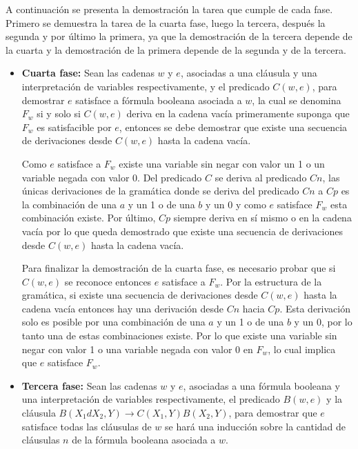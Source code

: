 A continuación se presenta la demostración la tarea que cumple de cada fase. Primero se demuestra la tarea de la cuarta fase, luego la tercera, después la segunda y por último la primera, ya que la demostración de la tercera depende de la cuarta y la demostración de la primera depende de la segunda y de la tercera.

\begin{itemize}
    \item \textbf{Cuarta fase:} Sean las cadenas $w$ y $e$, asociadas a una cláusula y una interpretación de variables respectivamente, y el predicado $C(w,e)$, para demostrar $e$
          satisface a fórmula booleana asociada a $w$, la cual se denomina $F_w$ si y solo si $C(w,e)$ deriva
          en la cadena vacía primeramente suponga que $F_w$ es satisfacible por $e$, entonces se debe demostrar que
          existe una secuencia de derivaciones desde $C(w,e)$ hasta la cadena vacía.
          
          Como $e$ satisface a $F_w$ existe una variable sin negar con valor un 1 o un variable negada con valor 0.
          Del predicado $C$ se deriva al predicado $Cn$, las únicas derivaciones de la gramática donde se deriva del
          predicado $Cn$ a $Cp$ es la combinación de una $a$ y un 1 o de una $b$ y un 0 y como $e$ satisface $F_w$ esta combinación existe.
          Por último, $Cp$ siempre deriva en sí mismo o en la cadena vacía por lo que queda demostrado que existe una secuencia de derivaciones desde $C(w,e)$ hasta la cadena vacía.
          
          Para finalizar la demostración de la cuarta fase, es necesario probar que si $C(w,e)$ se reconoce entonces $e$ satisface a $F_w$. Por la estructura de la gramática,
          si existe una secuencia de derivaciones desde $C(w,e)$ hasta la cadena vacía entonces hay una derivación
          desde $Cn$ hacia $Cp$. Esta derivación solo es posible por una combinación de una $a$ y un 1 o de una $b$ y
          un 0, por lo tanto una de estas combinaciones existe. Por lo que existe una variable sin negar con valor 1 o
          una variable negada con valor 0 en $F_w$, lo cual implica que $e$ satisface $F_w$.
          
    \item \textbf{Tercera fase:} Sean las cadenas $w$ y $e$, asociadas a una fórmula booleana y una interpretación de variables respectivamente, el predicado $B(w,e)$ y la cláusula $B(X_1dX_2,Y)\to C(X_1,Y) B(X_2,Y)$,
          para demostrar que $e$ satisface todas las cláusulas de $w$ se hará una inducción sobre la cantidad de cláusulas $n$ de la fórmula booleana asociada a $w$.
          

\end{itemize}
